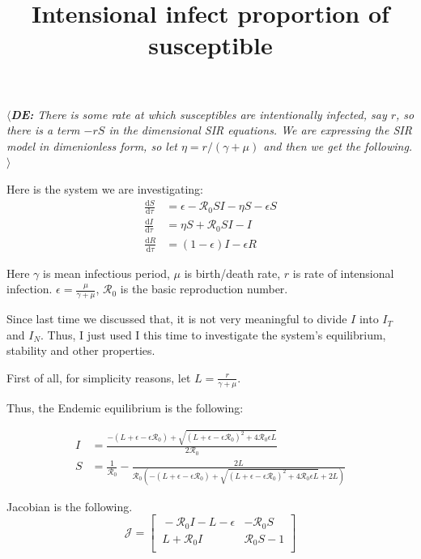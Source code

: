 \documentclass[12pt]{article}
\title{Intensional infect proportion of susceptible}
\newcommand{\de}[1]{$\langle${{\color{cyan}\slshape{\bfseries DE:} #1}$\rangle$}}
\begin{document}
\maketitle

\de{There is some rate at which susceptibles are intentionally infected, say $r$, so there is a term $-rS$ in the dimensional SIR equations.  We are expressing the SIR model in dimenionless form, so let $\eta=r/(\gamma+\mu)$ and then we get the following.}

Here is the system we are investigating:
\begin{align}
\frac{\mathrm{d}S}{\mathrm{d}\tau}&=\epsilon -\mathcal{R}_0 SI-\eta S-\epsilon S\\
\frac{\mathrm{d}I}{\mathrm{d}\tau}&=\eta S+\mathcal{R}_0 SI-I\\
\frac{\mathrm{d}R}{\mathrm{d}\tau}&=(1-\epsilon)I-\epsilon R
\end{align}

Here $\gamma$ is mean infectious period, $\mu$ is birth/death rate, $r$ is rate of intensional infection. $\epsilon=\frac{\mu}{\gamma+\mu}$, $\mathcal{R}_0$ is the basic reproduction number.

Since last time we discussed that, it is not very meaningful to divide $I$ into $I_T$ and $I_N$. Thus, I just used I this time to investigate the system's equilibrium, stability and other properties.

First of all, for simplicity reasons, let $L=\frac{r}{\gamma+\mu}$.

Thus, the Endemic equilibrium is the following:

\begin{align}
I &= \frac{-(L+\epsilon-\epsilon\mathcal{R}_0)+\sqrt{(L+\epsilon-\epsilon\mathcal{R}_0)^2+4\mathcal{R}_0\epsilon L}}{2\mathcal{R}_0}\\
S &= \frac{1}{\mathcal{R}_0}-\frac{2L}{\mathcal{R}_0(-(L+\epsilon-\epsilon\mathcal{R}_0)+\sqrt{(L+\epsilon-\epsilon\mathcal{R}_0)^2+4\mathcal{R}_0\epsilon L}+2L)}
\end{align}

Jacobian is the following.
\begin{equation}
\mathcal{J} =
\begin{bmatrix}
    \ -\mathcal{R}_0 I-L-\epsilon       & -\mathcal{R}_0 S \\
    \ L+\mathcal{R}_0 I       & \mathcal{R}_0 S-1 \\
\end{bmatrix}
\end{equation}
\end{document}
